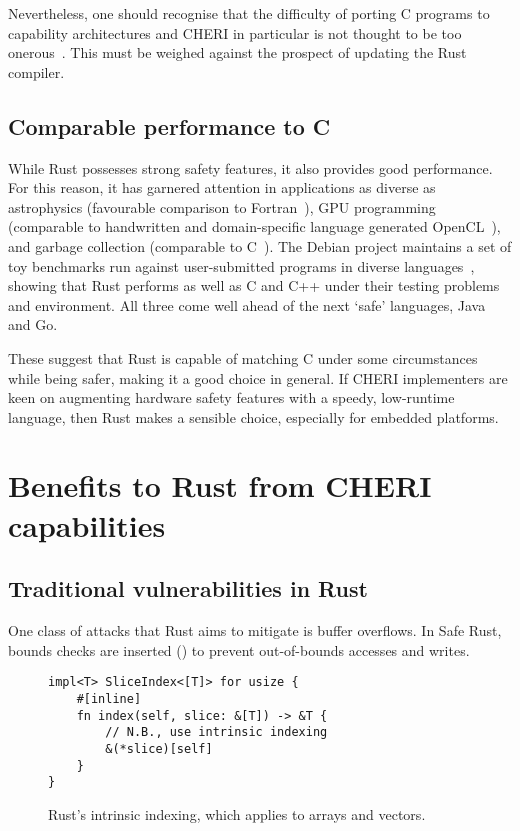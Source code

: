 \documentclass[dissertation.tex]{subfiles}
\begin{document}
Nevertheless, one should recognise that the difficulty of porting C
programs to capability architectures and CHERI in particular is not
thought to be too onerous~\cite{capsicum-usability}.
This must be weighed against the prospect of updating the Rust compiler.


\subsection{Comparable performance to C}
\label{eval:cheri-perf}

While Rust possesses strong safety features, it also provides good
performance.
For this reason, it has garnered attention in applications as diverse as
astrophysics (favourable comparison to Fortran~\cite{blanco-astro}), GPU
programming (comparable to handwritten and domain-specific language
generated OpenCL~\cite{holk-gpu}), and garbage collection (comparable to
C~\cite{lin-gc}).
The Debian project maintains a set of toy benchmarks run against
user-submitted programs in diverse
languages~\cite{debian-benchmarksgame}, showing that Rust performs as
well as C and C++ under their testing problems and environment.
All three come well ahead of the next `safe' languages, Java and Go.

These suggest that Rust is capable of matching C under some
circumstances while being safer, making it a good choice in general.
If CHERI implementers are keen on augmenting hardware safety features
with a speedy, low-runtime language, then Rust makes a sensible choice,
especially for embedded platforms.


\section{Benefits to Rust from CHERI capabilities}
\label{sec:eval-rust}

\subsection{Traditional vulnerabilities in Rust}
\label{sec:eval-rust-vulns}

One class of attacks that Rust aims to mitigate is buffer overflows.
In Safe Rust, bounds checks are inserted ()
to prevent out-of-bounds accesses and writes.

\begin{figure}[ht]
\begin{lstlisting}
impl<T> SliceIndex<[T]> for usize {
    #[inline]
    fn index(self, slice: &[T]) -> &T {
        // N.B., use intrinsic indexing
        &(*slice)[self]
    }
}
\end{lstlisting}
\caption{ Rust's intrinsic indexing, which applies to
arrays and vectors.}
\label{lst:rust-index}
\end{figure}
\end{document}
